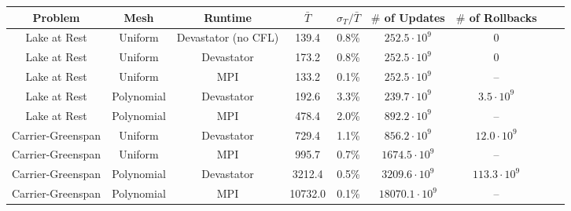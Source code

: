 
\begin{tabular}{|c|c|c|c|c|c|c|c|c|} \hline
Problem & Mesh & Runtime & $\bar{T}$ & $\sigma_T/\bar{T}$ & $\#$ of Updates & $\#$ of Rollbacks\\\hline
Lake at Rest & Uniform & Devastator (no CFL) &  139.4 & 0.8\% & $252.5\cdot 10^9$ & 0 \\\hline
Lake at Rest & Uniform & Devastator &  173.2 & 0.8\% & $252.5\cdot 10^9$ & 0 \\\hline
Lake at Rest & Uniform & MPI &  133.2 & 0.1\% & $252.5\cdot 10^9$ & -- \\\hline
Lake at Rest & Polynomial & Devastator &  192.6 & 3.3\% & $239.7\cdot 10^9$ & $  3.5\cdot 10^9$ \\\hline
Lake at Rest & Polynomial & MPI &  478.4 & 2.0\% & $892.2\cdot 10^9$ & -- \\\hline
Carrier-Greenspan & Uniform & Devastator &  729.4 & 1.1\% & $856.2\cdot 10^9$ & $ 12.0\cdot 10^9$ \\\hline
Carrier-Greenspan & Uniform & MPI &  995.7 & 0.7\% & $1674.5\cdot 10^9$ & -- \\\hline
Carrier-Greenspan & Polynomial & Devastator & 3212.4 & 0.5\% & $3209.6\cdot 10^9$ & $113.3\cdot 10^9$ \\\hline
Carrier-Greenspan & Polynomial & MPI & 10732.0 & 0.1\% & $18070.1\cdot 10^9$ & -- \\\hline
\end{tabular}